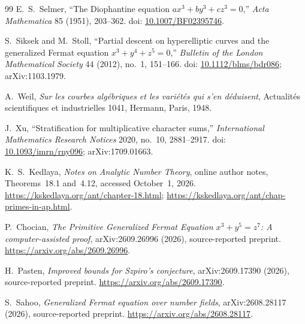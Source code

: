 \documentclass[11pt,a4paper]{article}
\begin{document}
\begin{thebibliography}{99}
E.~S.~Selmer, ``The Diophantine equation $ax^3+by^3+cz^3=0$,''
\emph{Acta Mathematica} 85 (1951), 203--362. doi:
\href{https://doi.org/10.1007/BF02395746}{10.1007/BF02395746}.

S.~Siksek and M.~Stoll, ``Partial descent on hyperelliptic curves and the generalized Fermat equation $x^3+y^4+z^5=0$,''
\emph{Bulletin of the London Mathematical Society} 44 (2012), no.\ 1, 151--166.
doi: \href{https://doi.org/10.1112/blms/bdr086}{10.1112/blms/bdr086};
arXiv:1103.1979.

A.~Weil, \emph{Sur les courbes algébriques et les variétés qui s'en déduisent},
Actualités scientifiques et industrielles 1041, Hermann, Paris, 1948.

J.~Xu, ``Stratification for multiplicative character sums,''
\emph{International Mathematics Research Notices} 2020, no.\ 10, 2881--2917.
doi: \href{https://doi.org/10.1093/imrn/rny096}{10.1093/imrn/rny096};
arXiv:1709.01663.

K.~S.~Kedlaya, \emph{Notes on Analytic Number Theory},
online author notes, Theorems~18.1 and~4.12, accessed October~1, 2026.
\url{https://kskedlaya.org/ant/chapter-18.html};
\url{https://kskedlaya.org/ant/chap-primes-in-ap.html}.

P.~Chocian, \emph{The Primitive Generalized Fermat Equation
$x^3+y^5=z^7$: A computer-assisted proof},
arXiv:2609.26996 (2026), source-reported preprint.
\url{https://arxiv.org/abs/2609.26996}.

H.~Pasten, \emph{Improved bounds for Szpiro's conjecture},
arXiv:2609.17390 (2026), source-reported preprint.
\url{https://arxiv.org/abs/2609.17390}.

S.~Sahoo, \emph{Generalized Fermat equation over number fields},
arXiv:2608.28117 (2026), source-reported preprint.
\url{https://arxiv.org/abs/2608.28117}.

\end{thebibliography}
\endgroup
\end{document}

